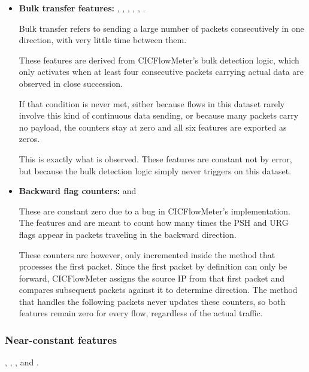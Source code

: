\begin{itemize}
    \item \textbf{Bulk transfer features:} , , , , , .

          Bulk transfer refers to sending a large number of packets consecutively in one direction, with very little time between them.

          These features are derived from CICFlowMeter's bulk detection logic, which only activates when at least four consecutive packets carrying actual data are observed in close succession.

          If that condition is never met, either because flows in this dataset rarely involve this kind of continuous data sending, or because many packets carry no payload, the counters stay at zero and all six features are exported as zeros.

          This is exactly what is observed. These features are constant not by error, but because the bulk detection logic simply never triggers on this dataset.

    \item \textbf{Backward flag counters:}  and 

          These are constant zero due to a bug in CICFlowMeter's implementation. The features  and  are meant to count how many times the PSH and URG flags appear in packets traveling in the backward direction.

          These counters are however, only incremented inside the method that processes the first packet. Since the first packet by definition can only be forward, CICFlowMeter assigns the source IP from that first packet and compares subsequent packets against it to determine direction.
          The method that handles the following packets never updates these counters, so both features remain zero for every flow, regardless of the actual traffic.
\end{itemize}

\vspace{-0.9cm}
\subsubsection{Near-constant features}

, , , and .

